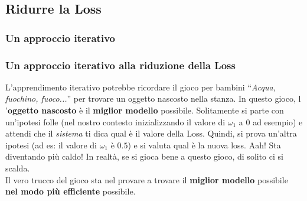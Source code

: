 \subsection[Ridurre la Loss]{Ridurre la Loss}

\subsubsection[Un approccio iterativo]{Un approccio iterativo}
\begin{frame}

	\frametitle{Un approccio iterativo alla riduzione della Loss}

		L'apprendimento iterativo potrebbe ricordare il gioco per bambini ``\textit{Acqua, fuochino, fuoco...}'' per trovare un oggetto nascosto nella stanza.
		\newlinedouble
		In questo gioco, l '\textbf{oggetto nascosto} è il \textbf{miglior modello} possibile.
		\newline
		Solitamente si parte con un'ipotesi folle (nel nostro contesto inizializzando il valore di $\omega_1$ a $0$ ad esempio) e attendi che il \textit{sistema} ti dica qual è il valore della Loss.
		\newlinedouble
		Quindi, si prova un'altra ipotesi (ad es: il valore di $\omega_1$ è $0.5$) e si valuta qual è la nuova loss.
		Aah! Sta diventando più caldo!
		\newlinedouble
		In realtà, se si gioca bene a questo gioco, di solito ci si scalda.\\
		Il vero trucco del gioco sta nel provare a trovare il \textbf{miglior modello} possibile \textbf{nel modo più efficiente} possibile.

\end{frame}



